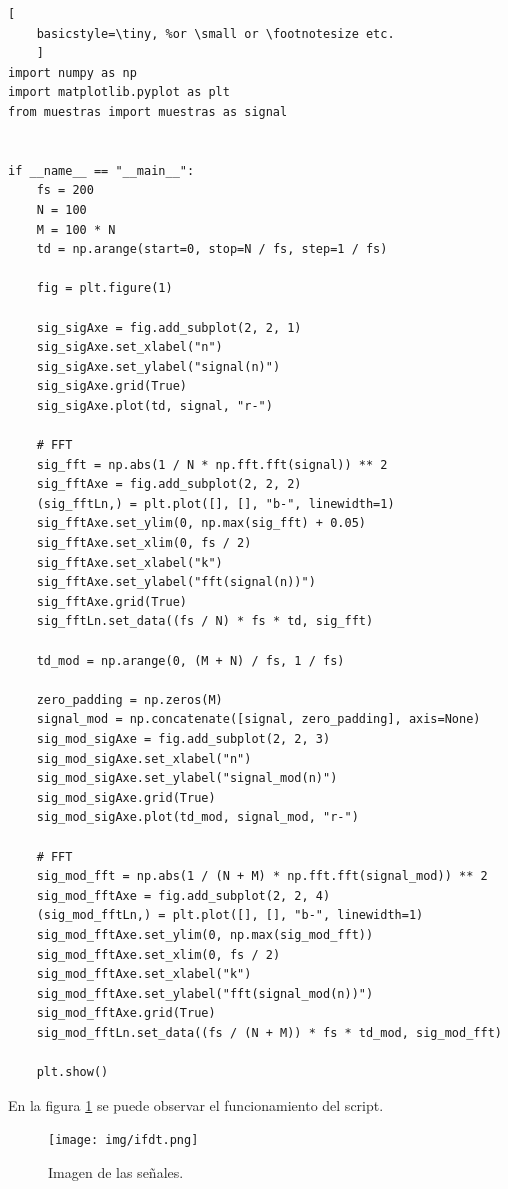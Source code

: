 \documentclass[
    11pt,
    spanish,
	a4paper
]{article}
\begin{document}
\begin{lstlisting}[
    basicstyle=\tiny, %or \small or \footnotesize etc.
    ]
import numpy as np
import matplotlib.pyplot as plt
from muestras import muestras as signal


if __name__ == "__main__":
    fs = 200
    N = 100
    M = 100 * N
    td = np.arange(start=0, stop=N / fs, step=1 / fs)

    fig = plt.figure(1)

    sig_sigAxe = fig.add_subplot(2, 2, 1)
    sig_sigAxe.set_xlabel("n")
    sig_sigAxe.set_ylabel("signal(n)")
    sig_sigAxe.grid(True)
    sig_sigAxe.plot(td, signal, "r-")

    # FFT
    sig_fft = np.abs(1 / N * np.fft.fft(signal)) ** 2
    sig_fftAxe = fig.add_subplot(2, 2, 2)
    (sig_fftLn,) = plt.plot([], [], "b-", linewidth=1)
    sig_fftAxe.set_ylim(0, np.max(sig_fft) + 0.05)
    sig_fftAxe.set_xlim(0, fs / 2)
    sig_fftAxe.set_xlabel("k")
    sig_fftAxe.set_ylabel("fft(signal(n))")
    sig_fftAxe.grid(True)
    sig_fftLn.set_data((fs / N) * fs * td, sig_fft)

    td_mod = np.arange(0, (M + N) / fs, 1 / fs)

    zero_padding = np.zeros(M)
    signal_mod = np.concatenate([signal, zero_padding], axis=None)
    sig_mod_sigAxe = fig.add_subplot(2, 2, 3)
    sig_mod_sigAxe.set_xlabel("n")
    sig_mod_sigAxe.set_ylabel("signal_mod(n)")
    sig_mod_sigAxe.grid(True)
    sig_mod_sigAxe.plot(td_mod, signal_mod, "r-")

    # FFT
    sig_mod_fft = np.abs(1 / (N + M) * np.fft.fft(signal_mod)) ** 2
    sig_mod_fftAxe = fig.add_subplot(2, 2, 4)
    (sig_mod_fftLn,) = plt.plot([], [], "b-", linewidth=1)
    sig_mod_fftAxe.set_ylim(0, np.max(sig_mod_fft))
    sig_mod_fftAxe.set_xlim(0, fs / 2)
    sig_mod_fftAxe.set_xlabel("k")
    sig_mod_fftAxe.set_ylabel("fft(signal_mod(n))")
    sig_mod_fftAxe.grid(True)
    sig_mod_fftLn.set_data((fs / (N + M)) * fs * td_mod, sig_mod_fft)

    plt.show()
\end{lstlisting}

En la figura \ref{fig:ifdt} se puede observar el funcionamiento del script.

\begin{figure}[htbp]
	\centering
	\texttt{[image: img/ifdt.png]}
	\caption{Imagen de las señales.}
	\label{fig:ifdt}
\end{figure}
\end{document}
